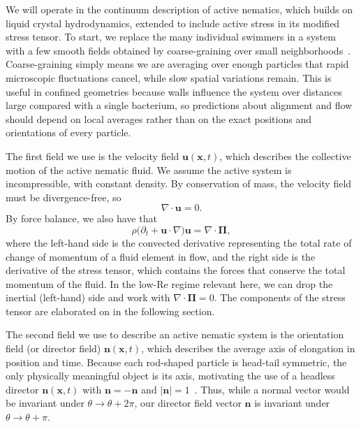 \documentclass[11pt]{article}
\begin{document}
We will operate in the continuum description of active nematics, which builds on liquid crystal hydrodynamics, extended to include active stress in its modified stress tensor. To start, we replace the many individual swimmers in a system with a few smooth fields obtained by coarse-graining over small neighborhoods~\cite{doostmohammadi2018active, simha2002hydrodynamic}. Coarse-graining simply means we are averaging over enough particles that rapid microscopic fluctuations cancel, while slow spatial variations remain. This is useful in confined geometries because walls influence the system over distances large compared with a single bacterium, so predictions about alignment and flow should depend on local averages rather than on the exact positions and orientations of every particle. 

The first field we use is the velocity field $\mathbf{u}(\mathbf{x},t)$, which describes the collective motion of the active nematic fluid. We assume the active system is incompressible, with constant density. By conservation of mass, the velocity field must be divergence-free, so 
\begin{equation}
    \nabla\!\cdot\!\mathbf{u}=0.
\end{equation}
By force balance, we also have that
\begin{equation}
\rho\big(\partial_t+\mathbf{u}\!\cdot\!\nabla\big)\mathbf{u}=\nabla\!\cdot\!\boldsymbol{\Pi},
\end{equation}
where the left-hand side is the convected derivative representing the total rate of change of momentum of a fluid element in flow, and the right side is the derivative of the stress tensor, which contains the forces that conserve the total momentum of the fluid. In the low-Re regime relevant here, we can drop the inertial (left-hand) side and work with $\nabla\cdot\boldsymbol{\Pi}=0$. The components of the stress tensor are elaborated on in the following section. 

The second field we use to describe an active nematic system is the orientation field  (or director field) $\mathbf{n}(\mathbf{x},t)$, which describes the average axis of elongation in position and time. Because each rod-shaped particle is head-tail symmetric, the only physically meaningful object is its axis, motivating the use of a headless director $\mathbf{n}(\mathbf{x},t)$ with $\mathbf{n} = -\mathbf{n}$ and $|\mathbf{n}|=1$~\cite{degennes1993physics}. Thus, while a normal vector would be invariant under $\theta \rightarrow \theta + 2\pi$, our director field vector $\textbf{n}$ is invariant under $\theta \rightarrow \theta + \pi$.
\end{document}
